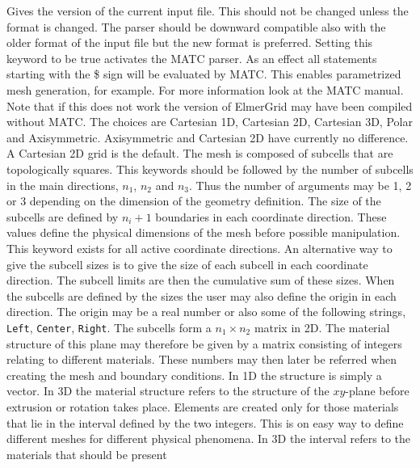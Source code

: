 \sifbegin
{}
Gives the version of the current input file. This should not be changed unless
the format is changed. The parser should be downward compatible also with the older
format of the input file but the new format is preferred.
%
Setting this keyword to be true activates the MATC parser. As an effect all statements 
starting with the \$ sign will be evaluated by MATC. This enables parametrized mesh generation,
for example. For more information look at the MATC manual. Note that if this does not work the 
version of ElmerGrid may have been compiled without MATC. 
%
The choices are Cartesian 1D, Cartesian 2D, Cartesian 3D, Polar and 
Axisymmetric. Axisymmetric and Cartesian 2D have currently
no difference.
A Cartesian 2D grid is the default.
%
The mesh is composed of subcells that are 
topologically squares. 
This keywords should be followed by the 
number of subcells in the main directions,
$n_1$, $n_2$ and $n_3$.
Thus the number of 
arguments may be 1, 2 or 3 depending on the dimension of the geometry 
definition. 
The size of the subcells are defined by $n_i+1$ boundaries
in each coordinate direction. These values define the physical 
dimensions of the mesh before possible manipulation. 
This keyword exists for all active coordinate directions.  
%
An alternative way to give the subcell sizes is to give the size of 
each subcell in each coordinate direction. 
The subcell limits are then the cumulative sum of these sizes.
%
When the subcells are defined by the sizes the user may also define the origin 
in each direction. The origin may be a real number or also some of the following 
strings, \texttt{Left}, \texttt{Center}, \texttt{Right}.
%
The subcells form a $n_1 \times n_2$ matrix in 2D. 
The material structure of this plane may therefore be given by a matrix 
consisting of integers relating to different materials.
These numbers may then later be referred
when creating the mesh and boundary conditions.
In 1D the structure is simply a vector.
In 3D the material structure refers to the structure of the 
$xy$-plane before extrusion or rotation takes place. 
%
Elements are created only for those materials that 
lie in the interval defined by the two integers.
This is on easy way to define different meshes for different physical
phenomena.
In 3D the interval refers to the materials that should be present

